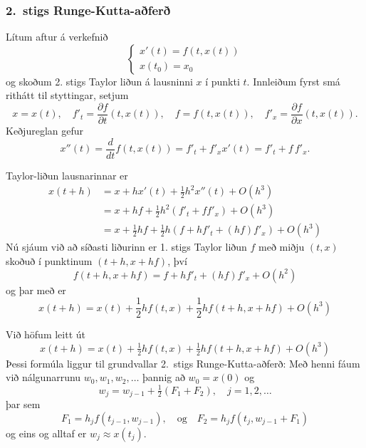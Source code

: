 \documentclass[icelandic,a4paper,12pt]{article}
\begin{document}
\subsubsection{2.~stigs Runge-Kutta-aðferð} 
Lítum aftur á verkefnið
\begin{equation*}
  \left\{
    \begin{array}{l}
      x'(t) = f(t,x(t)) \\
      x(t_0) = x_0
    \end{array}
  \right.
\end{equation*}
og skoðum 2. stigs Taylor liðun á lausninni $x$ í punkti
$t$. Innleiðum fyrst smá rithátt til styttingar, setjum 
\begin{equation*}
  x = x(t), \quad f'_t = \frac{\partial f}{\partial t}(t,x(t)), \quad
  f = f(t,x(t)), \quad f'_x = \frac{\partial f}{\partial x}(t,x(t)).
\end{equation*}
Keðjureglan gefur
$$
x''(t)=\dfrac d{dt}f(t,x(t))=f'_t+f'_xx'(t)=f'_t+f\,f'_x.
$$



Taylor-liðun lausnarinnar er 
\begin{align*}
  x(t+h) &= x + hx'(t) + \frac{1}{2} h^2 x''(t) + O(h^3) \\
  &= x + hf + \frac{1}{2} h^2 ( f'_t + f f'_x ) + O(h^3) \\
  &= x + \frac{1}{2}hf + \frac{1}{2}h( f + hf'_t + (hf)f'_x) + O(h^3)
\end{align*}
Nú sjáum við að síðasti liðurinn er 1. stigs Taylor 
liðun $f$ með miðju $(t,x)$ skoðuð í punktinum $(t+h,x+hf)$, því
\begin{equation*}
  f(t+h,x + hf) = f + hf'_t + (hf) f'_x + O(h^2)
\end{equation*}
og þar með er
\begin{equation*}
  x(t+h) = x(t) + \frac{1}{2} hf(t,x) + \frac{1}{2} hf(t+h,x+hf) + O(h^3)
\end{equation*}



Við höfum leitt út
\begin{equation*}
  x(t+h) = x(t) + \tfrac{1}{2} hf(t,x) + \tfrac{1}{2} hf(t+h,x+hf) + O(h^3)
\end{equation*}
Þessi formúla liggur til grundvallar 
2.~stigs Runge-Kutta-aðferð:
Með henni fáum við nálgunarrunu $w_0, w_1, w_2, \ldots$ þannig að
$w_0=x(0)$ og 
\begin{equation*}
  w_j = w_{j-1} + \tfrac{1}{2}(F_1 + F_2), \quad j = 1,2,\ldots
\end{equation*}
þar sem
\begin{equation*}
  F_1 = h_jf(t_{j-1},w_{j-1}),
  \quad \text{og} \quad
  F_2 = h_jf(t_j,w_{j-1}+F_1)
\end{equation*}
og eins og alltaf er $w_j \approx x(t_j)$.
\end{document}
